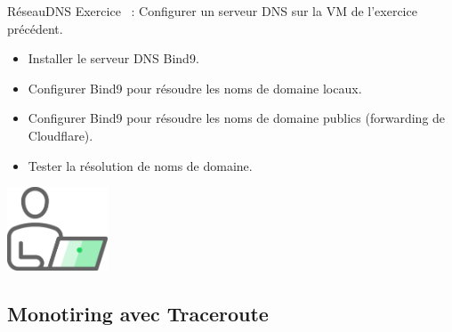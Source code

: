 \documentclass{beamer}
\begin{document}
    \begin{frame}{Réseau}{DNS}
        Exercice \execcounterdispinc~: Configurer un serveur DNS sur la VM de l'exercice précédent.
        \begin{itemize}
            \item Installer le serveur DNS Bind9.
            \item Configurer Bind9 pour résoudre les noms de domaine locaux.
            \item Configurer Bind9 pour résoudre les noms de domaine publics (forwarding de Cloudflare).
            \item Tester la résolution de noms de domaine.
        \end{itemize}
        \begin{center}
            \includegraphics[width=3cm]{image/guy-in-front-of-desktop}
        \end{center}
    \end{frame}

    \subsection{Monotiring avec Traceroute}\label{subsec:mon-traceroute}
\end{document}
